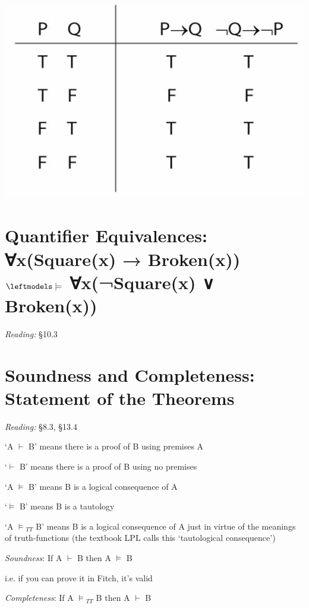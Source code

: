 \documentclass[12pt]{extarticle}
\begin{document}
\begin{multicols*}{3}
\begin{center}
\includegraphics[scale=0.3]{img/unit_760_tt.png}
\end{center}
 
 
\section{Quantifier Equivalences: ∀x(Square(x) → Broken(x)) $\leftmodels\models$ ∀x(¬Square(x) ∨ Broken(x))}
 
\emph{Reading:} §10.3
 
 
 
\section{Soundness and Completeness: Statement of the Theorems}
 
\emph{Reading:} §8.3, §13.4
 
‘A $\vdash$ B’ means there is a proof of B using premises A
 
‘$\vdash$ B’ means there is a proof of B using no premises
 
‘A $\models$ B’ means B is a logical consequence of A
 
‘$\models$ B’ means B is a tautology
 
‘A $\models$$_{TT}$ B’ means B is a logical consequence of A just in virtue of the meanings of truth-functions (the textbook LPL calls this ‘tautological consequence’)
 
\emph{Soundness}: If A $\vdash$ B then A $\models$ B
 
\hspace{3mm} i.e. if you can prove it in Fitch, it’s valid
 
\emph{Completeness}: If A $\models$$_{TT}$ B then A $\vdash$ B
 

\end{multicols*}
\end{document}
